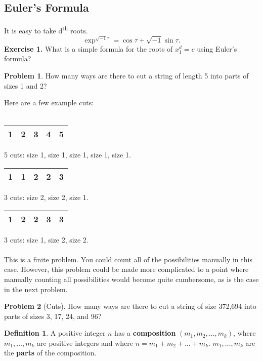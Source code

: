 \documentclass[]{article}
\theoremstyle{definition}
\newtheorem{problem}{Problem}[section]
\newtheorem*{defn}{Definition}
\begin{document}
			\subsection{Euler's Formula}
			It is easy to take d\textsuperscript{th} roots.
			\[ \exp^{\sqrt{-1}\tau}= \cos\tau+\sqrt{-1}\sin\tau.\]
			\textbf{Exercise 1.}
			What is a simple formula for the roots of $x_1^{d}=c$ using Euler's formula?
			\begin{problem}
				How many ways are there to cut a string of length 5 into parts of sizes 1 and 2?
			\end{problem}

			Here are a few example cuts:
			\\ \\
			\begin{tabular}{|c|c|c|c|c|}
				\hline
				1 & 2 & 3 & 4 & 5 \\
				\hline
			\end{tabular}
			5 cuts: size 1, size 1, size 1, size 1, size 1.

			\begin{tabular}{|c|c|c|c|c|}
				\hline
				1 & 1 & 2 & 2 & 3 \\
				\hline
			\end{tabular}
			3 cuts: size 2, size 2, size 1.

			\begin{tabular}{|c|c|c|c|c|}
				\hline
				1 & 2 & 2 & 3 & 3 \\
				\hline
			\end{tabular}
			3 cuts: size 1, size 2, size 2.
			\\ \\
			This is a finite problem. You could count all of the possibilities manually in this case. However, this problem could be made more complicated to a point where manually counting all possibilities would become quite cumbersome, as is the case in the next problem.

			\begin{problem}[Cuts]
				How many ways are there to cut a string of size 372,694 into parts of sizes 3, 17, 24, and 96?
			\end{problem}

			\begin{defn}
				A positive integer $n$ has a \textbf{composition} $(m_1, m_2, \ldots, m_k)$, where $m_1, \ldots, m_k$ are positive integers and where $n = m_1 + m_2 + \ldots + m_k$. $m_1, \ldots, m_k$ are the \textbf{parts} of the composition.
			\end{defn}
\end{document}
